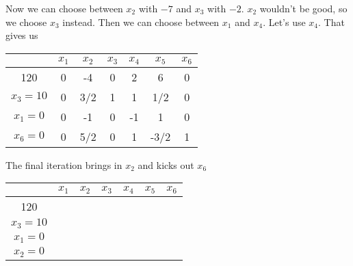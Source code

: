 \begin{Ex}
Now we can choose between $x_2$ with $-7$ and $x_3$ with $-2$. $x_2$ wouldn't be good, so we choose $x_3$ instead. Then we can choose between $x_1$ and $x_4$. Let's use $x_4$. That gives us

\begin{tabular}{c|cccccc}
  & $x_1$ & $x_2$ & $x_3$ & $x_4$ & $x_5$ & $x_6$ \\\hline
120 & 0 & -4 & 0 & 2 & 6 & 0\\
$x_3=10$ & 0 & 3/2 & 1 & 1 & 1/2 & 0 \\
$x_1=0$ &0  & -1 & 0 & -1 &  1 & 0\\
$x_6=0$ & 0 & 5/2 & 0 & 1 & -3/2 &  1\\
\end{tabular}

The final iteration brings in $x_2$ and kicks out $x_6$

\begin{tabular}{c|cccccc}
         & $x_1$ & $x_2$ & $x_3$ & $x_4$ & $x_5$ & $x_6$ \\\hline
120      &\\
$x_3=10$ &\\
$x_1=0$  &\\
$x_2=0$  &\\
\end{tabular}

\end{Ex}


